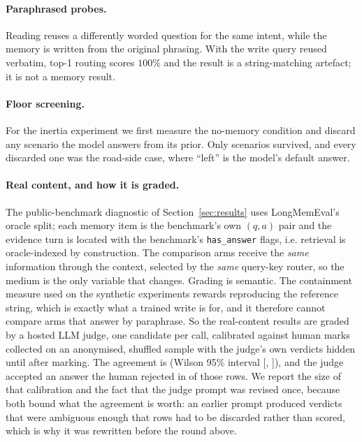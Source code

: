 \documentclass[11pt]{article}
\begin{document}
\paragraph{Paraphrased probes.} Reading reuses a differently worded question for
the same intent, while the memory is written from the original phrasing. With the
write query reused verbatim, top-1 routing scores $100\%$ and the result is a
string-matching artefact; it is not a memory result.

\paragraph{Floor screening.} For the inertia experiment we first measure the
no-memory condition and discard any scenario the model answers from its prior.
Only \tScreenKept{} scenarios survived, and every discarded one was the road-side
case, where ``left'' is the model's default answer.

\paragraph{Real content, and how it is graded.} The public-benchmark diagnostic of
Section~\ref{sec:results} uses LongMemEval's oracle split; each memory item is the
benchmark's own $(q,a)$ pair and the evidence turn is located with the benchmark's
\texttt{has\_answer} flags, i.e. retrieval is oracle-indexed by construction. The
comparison arms receive the \emph{same} information through the context, selected by
the \emph{same} query-key router, so the medium is the only variable that changes.
Grading is semantic. The containment measure used on the synthetic experiments rewards reproducing the reference string, which is exactly what a trained write is for, and it therefore cannot compare arms that answer by paraphrase. So the real-content results are graded by a hosted LLM judge, one
candidate per call, calibrated against \tJudgeMergedMarks{} human marks collected on
an anonymised, shuffled sample with the judge's own verdicts hidden until after
marking. The agreement is \tJudgeMergedRate{} (Wilson 95\% interval
[\tJudgeMergedLow{}, \tJudgeMergedHigh{}]), and the judge accepted an answer the human
rejected in \tJudgeMergedFalsePositives{} of those rows. We report the size of that
calibration and the fact that the judge prompt was revised once, because both bound
what the agreement is worth: an earlier prompt produced verdicts that were ambiguous
enough that rows had to be discarded rather than scored, which is why it was rewritten
before the round above.
\end{document}
